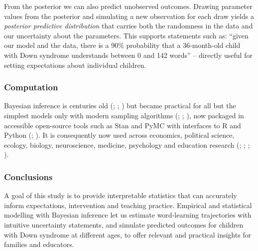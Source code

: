 \documentclass[
  11pt,
  a4paper,
]{report}
\begin{document}
From the posterior we can also predict unobserved outcomes. Drawing
parameter values from the posterior and simulating a new observation for
each draw yields a \emph{posterior predictive distribution} that carries
both the randomness in the data and our uncertainty about the
parameters. This supports statements such as: ``given our model and the
data, there is a 90\% probability that a 36-month-old child with Down
syndrome understands between 0 and 142 words'' -- directly useful for
setting expectations about individual children.

\subsubsection{Computation}\label{computation}

Bayesian inference is centuries old
(;
;
)
but became practical for all but the simplest models only with modern
sampling algorithms
(;
; ), now packaged in accessible open-source tools such as
Stan and PyMC with interfaces to R and Python
(; ). It is consequently now used across economics,
political science, ecology, biology, neuroscience, medicine, psychology
and education research (; ;
; ).

\subsubsection{Conclusions}\label{conclusions}

A goal of this study is to provide interpretable statistics that can
accurately inform expectations, intervention and teaching practice.
Empirical and statistical modelling with Bayesian inference let us
estimate word-learning trajectories with intuitive uncertainty
statements, and simulate predicted outcomes for children with Down
syndrome at different ages, to offer relevant and practical insights for
families and educators.
\end{document}
